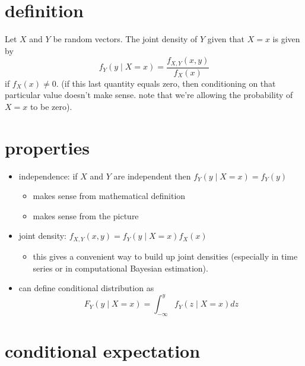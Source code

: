 \section{definition}

    Let $X$ and $Y$ be random vectors.  The joint density of $Y$
    given that $X = x$ is given by
    \[ f_Y(y \mid X = x) = \frac{f_{X,Y}(x, y)}{f_X(x)} \]
    if $f_X(x) \neq 0$.  (if this last quantity equals zero, then
    conditioning on that particular value doesn't make sense.  note
    that we're allowing the probability of $X=x$ to be zero).

\section{properties}

\begin{itemize}
\item independence: if $X$ and $Y$ are independent then 
      $f_Y(y \mid X = x) = f_Y(y)$
\begin{itemize}
\item makes sense from mathematical definition
\item makes sense from the picture
\end{itemize}
\item joint density: $f_{X,Y}(x,y) = f_Y(y \mid X = x) f_X(x)$
\begin{itemize}
\item this gives a convenient way to build up joint densities
        (especially in time series or in computational Bayesian
        estimation).
\end{itemize}
\item can define conditional distribution as
      \[ F_Y(y \mid X=x) = \int_{-\infty}^y f_Y(z \mid X = x) dz \]
\end{itemize}

\section{conditional expectation}

